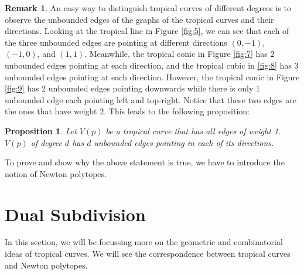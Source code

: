 \documentclass[]{article}
\theoremstyle{definition}
\numberwithin{equation}{section}
\newtheorem{prop}[thm]{Proposition}
\newtheorem{rmk}[thm]{Remark}
\renewcommand{\.}{\,.}
\begin{document}
\begin{rmk}
	An easy way to distinguish tropical curves of different degrees is to observe the unbounded edges of the graphs of the tropical curves and their directions. Looking at the tropical line in Figure \ref{fig:5}, we can see that each of the three unbounded edges are pointing at different directions $(0,-1)$, $(-1,0)$, and $(1,1)$. Meanwhile, the tropical conic in Figure \ref{fig:7} has 2 unbounded edges pointing at each direction, and the tropical cubic in \ref{fig:8} has 3 unbounded edges pointing at each direction. However, the tropical conic in Figure \ref{fig:9} has 2 unbounded edges pointing downwards while there is only 1 unbounded edge each pointing left and top-right. Notice that these two edges are the ones that have weight 2. This leads to the following proposition:
\end{rmk}
\begin{prop} \label{LMAP}
	\emph{Let $V(p)$ be a tropical curve that has all edges of weight 1. $V(p)$ of degree $d$ has $d$ unbounded edges pointing in each of its directions.}
\end{prop}
\hspace{3mm} To prove and show why the above statement is true, we have to introduce the notion of Newton polytopes.

\newpage
\section{Dual Subdivision}
\hspace{3mm} In this section, we will be focussing more on the geometric and combinatorial ideas of tropical curves. We will see the correspondence between tropical curves and Newton polytopes.
\end{document}
